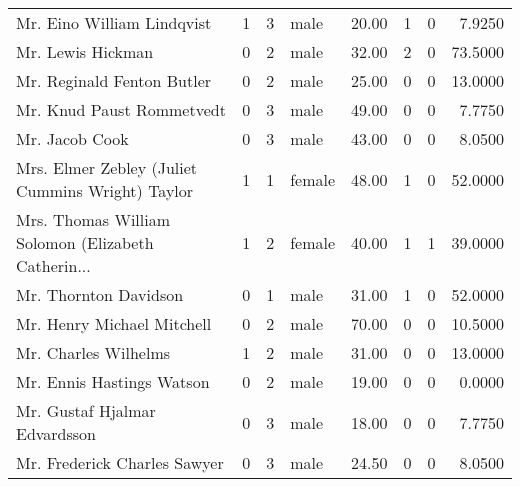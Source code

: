 \begin{tabular}{lrrlrrrr}
Mr. Eino William Lindqvist                         &         1 &       3 &    male &  20.00 &                        1 &                        0 &    7.9250 \\
Mr. Lewis Hickman                                  &         0 &       2 &    male &  32.00 &                        2 &                        0 &   73.5000 \\
Mr. Reginald Fenton Butler                         &         0 &       2 &    male &  25.00 &                        0 &                        0 &   13.0000 \\
Mr. Knud Paust Rommetvedt                          &         0 &       3 &    male &  49.00 &                        0 &                        0 &    7.7750 \\
Mr. Jacob Cook                                     &         0 &       3 &    male &  43.00 &                        0 &                        0 &    8.0500 \\
Mrs. Elmer Zebley (Juliet Cummins Wright) Taylor   &         1 &       1 &  female &  48.00 &                        1 &                        0 &   52.0000 \\
Mrs. Thomas William Solomon (Elizabeth Catherin... &         1 &       2 &  female &  40.00 &                        1 &                        1 &   39.0000 \\
Mr. Thornton Davidson                              &         0 &       1 &    male &  31.00 &                        1 &                        0 &   52.0000 \\
Mr. Henry Michael Mitchell                         &         0 &       2 &    male &  70.00 &                        0 &                        0 &   10.5000 \\
Mr. Charles Wilhelms                               &         1 &       2 &    male &  31.00 &                        0 &                        0 &   13.0000 \\
Mr. Ennis Hastings Watson                          &         0 &       2 &    male &  19.00 &                        0 &                        0 &    0.0000 \\
Mr. Gustaf Hjalmar Edvardsson                      &         0 &       3 &    male &  18.00 &                        0 &                        0 &    7.7750 \\
Mr. Frederick Charles Sawyer                       &         0 &       3 &    male &  24.50 &                        0 &                        0 &    8.0500 \\

\end{tabular}
